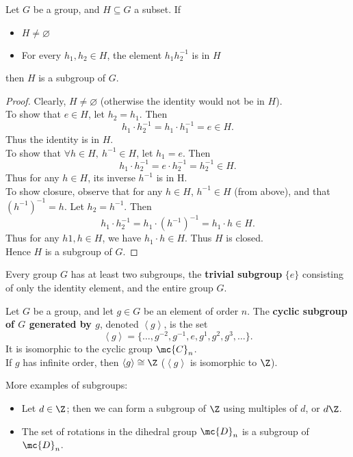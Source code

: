 \documentclass[math1530-lecture-notes]{subfiles}
\begin{document}
\begin{proposition}{}
  Let $G$ be a group, and $H\subseteq G$ a subset. If 
  \begin{itemize}
    \item $H\neq \varnothing$ 
    \item For every $h_1,h_2\in H$, the element $ h_1h_2^{-1}$ is in $H$
  \end{itemize}
  then $H$ is a subgroup of $G$.
\end{proposition}
\begin{proof}[Proof]
  Clearly, $H\neq \varnothing$ (otherwise the identity would not be in $H$). \\
  To show that $e\in H$, let $h_2=h_1$. Then \[
    h_1\cdot h_2^{-1}=h_1\cdot h_1^{-1}=e\in H
  .\] Thus the identity is in $H$.\\
  To show that $\forall h\in H,\ h^{-1}\in H$, let $h_1=e$. Then \[
    h_1\cdot h_2^{-1}=e\cdot h_2^{-1}=h_2^{-1}\in H
  .\] Thus for any $h\in H$, its inverse $h^{-1}$ is in H.\\
  To show closure, observe that for any $h\in H$, $h^{-1}\in H$ (from above), and that
  $(h^{-1})^{-1}=h$. Let $h_2=h^{-1}$. Then \[
    h_1\cdot h_2^{-1}=h_1\cdot (h^{-1})^{-1}=h_1\cdot h\in H
  .\] Thus for any $h1,h\in H$, we have $ h_1\cdot h\in H$. Thus $H$ is closed.\\

  Hence $H$ is a subgroup of $G$.
\end{proof}

\begin{example}
  Every group $G$ has at least two subgroups, the \textbf{trivial subgroup} $\{ e \}$ consisting of
  only the identity element, and the entire group $G$.
\end{example}
\begin{example}
  Let $G$ be a group, and let $g\in G$ be an element of order $n$. The \textbf{cyclic subgroup of
  $G$ generated by $g$}, denoted $\left< g \right>$, is the set \[
    \left<g \right> = \{ \ldots,g^{-2},g^{-1},e,g^{1},g^2,g^3,\ldots \}
  .\] 
  It is isomorphic to the cyclic group $\mc{C}_n$.\\
  
  If $g$ has infinite order, then $\left< g\right>\cong \Z$ ($\left<g \right>$ is isomorphic to
  $\Z$).
\end{example}

\begin{example}
  More examples of subgroups:
  \begin{itemize}
    \item Let $d\in \Z$; then we can form a subgroup of $\Z$ using multiples of $d$, or $d\Z$.
    \item The set of rotations in the dihedral group $\mc{D}_n$ is a subgroup of $\mc{D}_n$.
  \end{itemize}
\end{example}
\end{document}
